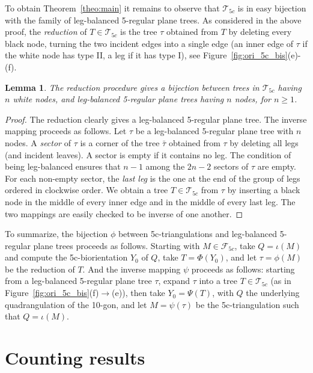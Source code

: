 \documentclass[letter]{amsart}
\numberwithin{theo}{section}
\newtheorem{lemma}[theo]{Lemma}
\theoremstyle{remark}
\def\cF{\mathcal{F}}
\def\cT{\mathcal{T}}
\def\cTfc{\cT_{5c}}
\def\cFfc{\cF_{5c}}
\def\btau{\bar{\tau}}
\begin{document}
To obtain Theorem~\ref{theo:main} it remains to observe that $\cTfc$ is in easy bijection with the family of leg-balanced 5-regular plane trees. As considered in the above proof, 
the \emph{reduction} of $T\in\cTfc$ is the tree $\tau$ obtained from $T$  
by deleting every black node, turning the two incident edges into a single edge (an inner edge of $\tau$ if the white node has type II, a leg if it has type I),
 see  Figure~\ref{fig:ori_5c_bis}(e)-(f).   

\begin{lemma}
The reduction procedure gives a bijection between trees in $\cTfc$ having $n$ white nodes,  and leg-balanced 5-regular plane trees having $n$ nodes, for $n\geq 1$. 
\end{lemma}
\begin{proof}
The reduction clearly gives a leg-balanced 5-regular plane tree. The inverse mapping proceeds as follows. Let $\tau$ be a leg-balanced 5-regular plane tree with $n$ nodes. A \emph{sector}  of $\tau$ is a corner of the tree $\btau$ obtained from $\tau$ by deleting all legs (and incident leaves). A sector is empty if it contains no leg. The condition of being leg-balanced ensures that $n-1$ among the $2n-2$ sectors of $\tau$ are empty. For each non-empty sector, the \emph{last leg} is the one at the end of the group of legs ordered in clockwise order. We obtain a tree $T\in\cTfc$ from $\tau$ by inserting a black node in the middle of every inner edge and in the middle of every last leg. The two mappings are easily checked to be inverse of one another.  
\end{proof}

To summarize, the bijection $\phi$ between 5c-triangulations and leg-balanced 5-regular plane trees proceeds as follows. Starting with $M\in\cFfc$, take $Q=\iota(M)$ and compute the 5c-biorientation $Y_0$ of $Q$, take $T=\Phi(Y_0)$, and let $\tau=\phi(M)$ be the reduction of $T$. And the inverse mapping $\psi$ proceeds as follows: starting from a leg-balanced 5-regular plane tree $\tau$, expand $\tau$ into a tree $T\in \cTfc$ (as in Figure~\ref{fig:ori_5c_bis}(f)$\to$(e)), then take $Y_0=\Psi(T)$, with $Q$ the underlying quadrangulation of the 10-gon, and let $M=\psi(\tau)$ be the 5c-triangulation such that $Q=\iota(M)$.  



\section{Counting results}\label{sec:counting}
\end{document}
